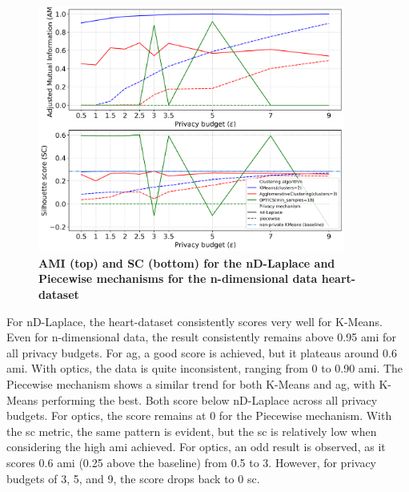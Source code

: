 \begin{figure}[H]
  \centering

  \caption{\textbf{AMI (top) and SC (bottom) for the nD-Laplace and Piecewise mechanisms for the n-dimensional data heart-dataset}}
  \includegraphics[width=0.9\textwidth]{Results/nd-laplace/nd-Laplace/heart-dataset/ami-and-sc_9_dimensions.png}

  \label{fig:validation-heart-dataset_comparison_nd-laplace}
\end{figure}
For nD-Laplace, the heart-dataset consistently scores very well for K-Means. Even for n-dimensional data, the result consistently remains above 0.95 \gls{ami} for all privacy budgets.
For \gls{ag}, a good score is achieved, but it plateaus around 0.6 \gls{ami}.
With \gls{optics}, the data is quite inconsistent, ranging from 0 to 0.90 \gls{ami}.
The Piecewise mechanism shows a similar trend for both K-Means and \gls{ag}, with K-Means performing the best. Both score below nD-Laplace across all privacy budgets.
For \gls{optics}, the score remains at 0 for the Piecewise mechanism.
With the \gls{sc} metric, the same pattern is evident, but the \gls{sc} is relatively low when considering the high \gls{ami} achieved. For \gls{optics}, an odd result is observed, as it scores 0.6 \gls{ami} (0.25 above the baseline) from 0.5 to 3. However, for privacy budgets of 3, 5, and 9, the score drops back to 0 \gls{sc}.

\newpage
